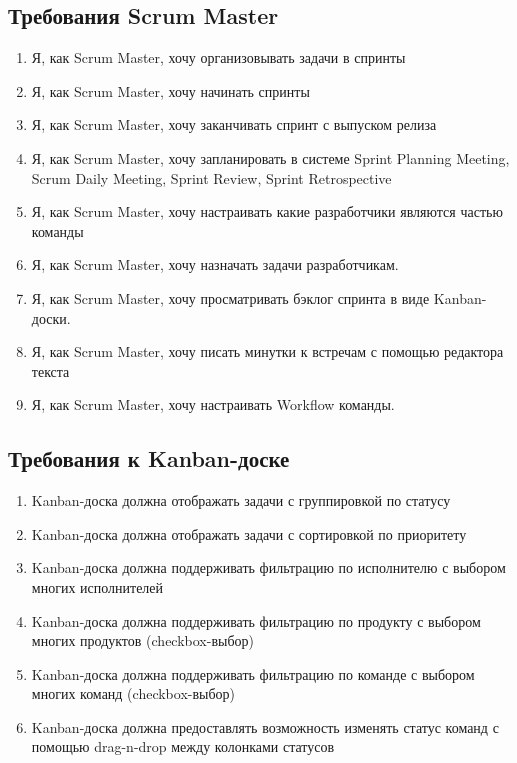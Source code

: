 \documentclass[14pt,a4paper]{extarticle}
\begin{document}
\subsection{Требования Scrum Master}
\begin{enumerate}[label=\textbf{SMR\arabic*}.]
	\item Я, как Scrum Master, хочу организовывать задачи в спринты
	\item Я, как Scrum Master, хочу начинать спринты
	\item Я, как Scrum Master, хочу заканчивать спринт с выпуском релиза
	\item Я, как Scrum Master, хочу запланировать в системе
	      Sprint Planning Meeting, Scrum Daily Meeting, Sprint Review, Sprint Retrospective
	\item Я, как Scrum Master, хочу настраивать какие разработчики являются частью команды
	\item Я, как Scrum Master, хочу назначать задачи разработчикам.
	\item Я, как Scrum Master, хочу просматривать бэклог спринта в виде Kanban-доски.
	\item Я, как Scrum Master, хочу писать минутки к встречам с помощью редактора текста
	\item Я, как Scrum Master, хочу настраивать Workflow команды.
\end{enumerate}

\subsection{Требования к Kanban-доске}
\begin{enumerate}[label=\textbf{KBR\arabic*}.]
	\item Kanban-доска должна отображать задачи с группировкой по статусу
	\item Kanban-доска должна отображать задачи с сортировкой по приоритету
	\item Kanban-доска должна поддерживать фильтрацию по исполнителю с выбором
	      многих исполнителей
	\item Kanban-доска должна поддерживать фильтрацию по продукту с выбором
	      многих продуктов (checkbox-выбор)
	\item Kanban-доска должна поддерживать фильтрацию по команде с выбором
	      многих команд (checkbox-выбор)
	\item Kanban-доска должна предоставлять возможность изменять статус
	      команд с помощью drag-n-drop между колонками статусов
\end{enumerate}
\end{document}
